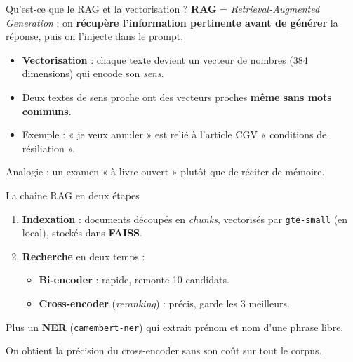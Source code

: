 \documentclass[aspectratio=169,11pt]{beamer}
\newcommand{\code}[1]{\texttt{\small #1}}
\newcommand{\hl}[1]{\textbf{\color{accent}#1}}
\begin{document}
\begin{frame}{Qu'est-ce que le RAG et la vectorisation ?}
  \hl{RAG} = \emph{Retrieval-Augmented Generation} : on \hl{récupère l'information
  pertinente avant de générer} la réponse, puis on l'injecte dans le prompt.
  \vspace{0.4cm}
  \begin{itemize}
    \item \hl{Vectorisation} : chaque texte devient un vecteur de nombres
          (384 dimensions) qui encode son \emph{sens}.
    \item Deux textes de sens proche ont des vecteurs proches \hl{même sans mots
          communs}.
    \item Exemple : « je veux annuler » est relié à l'article CGV
          « conditions de résiliation ».
  \end{itemize}
  \vfill
  \begin{center}\small\color{soft}
    Analogie : un examen « à livre ouvert » plutôt que de réciter de mémoire.
  \end{center}
\end{frame}

\begin{frame}{La chaîne RAG en deux étapes}
  \begin{enumerate}
    \item \hl{Indexation} : documents découpés en \emph{chunks}, vectorisés par
          \code{gte-small} (en local), stockés dans \hl{FAISS}.
    \item \hl{Recherche} en deux temps :
      \begin{itemize}\small
        \item \textbf{Bi-encoder} : rapide, remonte 10 candidats.
        \item \textbf{Cross-encoder} (\emph{reranking}) : précis, garde les 3 meilleurs.
      \end{itemize}
  \end{enumerate}
  \vspace{0.3cm}
  Plus un \hl{NER} (\code{camembert-ner}) qui extrait prénom et nom d'une phrase libre.
  \vfill
  \begin{center}\small\color{soft}
    On obtient la précision du cross-encoder sans son coût sur tout le corpus.
  \end{center}
\end{frame}
\end{document}
